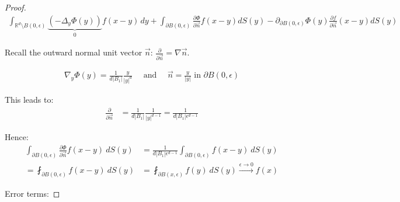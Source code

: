 \documentclass{report}
\theoremstyle{tommy}
\begin{document}
\begin{proof}
  \begin{align*}
    \int_{\mathbb{R}^d \setminus B(0, \epsilon)} \underbrace{(-\Delta_y \Phi(y))}_{0} f(x-y) \, dy + \int_{\partial B(0, \epsilon)} \frac{\partial \Phi}{\partial \vec{n}} f(x-y) dS(y) - \partial_{\partial B(0, \epsilon)} \Phi(y) \frac{\partial f}{\partial \vec{n}}(x-y) dS(y)
  \end{align*}

  Recall the outward normal unit vector \(\vec{n}\): \(\frac{\partial}{\partial \vec{n}} = \nabla \vec{n}\).

    \begin{align*}
      \nabla_y \Phi(y) = \frac{1}{d |B_1|} \frac{y}{|y|^d} \quad \text{ and } \quad \vec{n} = \frac{y}{|y|} \text{ in } \partial B(0, \epsilon)
    \end{align*}

    This leads to:
    \begin{align*}
      \frac{\partial}{\partial \vec{n}} &= \frac{1}{d |B_1|} \frac{1}{|y|^{d-1}} = \frac{1}{d |B_1| \epsilon^{d-1}}
    \end{align*}

    Hence:
    \begin{align*}
      \int_{\partial B(0, \epsilon)} \frac{\partial \Phi}{\partial \vec{n}} f(x-y) \ dS(y) 
      &= \frac{1}{d |B_1| \epsilon^{d-1}} \int_{\partial B(0, \epsilon)} f(x-y) \ dS(y) \\
      = \fint_{\partial B(0, \epsilon)} f(x-y) \ dS(y)
      &= \fint_{\partial B(x, \epsilon)} f(y) \ dS(y) 
      \xrightarrow{\epsilon \to 0} f(x)
    \end{align*}

      Error terms:
      

\end{proof}
\end{document}
